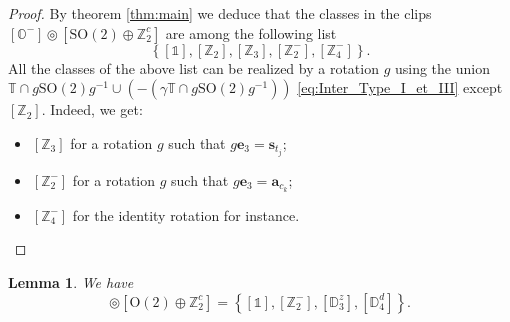 \documentclass[11pt,a4paper]{amsart}
\newtheorem{lem}[thm]{Lemma}
\theoremstyle{definition}
\newcommand{\ZZ}{\mathbb{Z}}                %
\newcommand{\OO}{\mathrm{O}}                %
\newcommand{\SO}{\mathrm{SO}}               %
\newcommand{\octa}{\mathbb{O}}              %
\newcommand{\tetra}{\mathbb{T}}             %
\newcommand{\DD}{\mathbb{D}}                %
\newcommand{\1}{\mathds{1}}		            %
\newcommand{\ee}{\pmb{e}}                   %
\newcommand{\uu}{\pmb{u}}                   %
\newcommand{\vR}{\mathbf{r}}
\newcommand{\bs}{\mathbf{s}}
\newcommand{\set}[1]{\left\{#1\right\}}     %
\begin{document}
\begin{proof}
	By theorem \ref{thm:main} we deduce that the classes in the clips $[\octa^-] \circledcirc [\SO(2) \oplus \ZZ_2^c]$ are among the following list
	\begin{equation*}
		\set{[\1],[\ZZ_2],[\ZZ_3],[\ZZ_2^-],[\ZZ_{4}^-]}.
	\end{equation*} 
	All the classes of the above list can be realized by a rotation $g$ using the union $ \tetra\cap g\SO(2)g^{-1} \cup (-(\gamma\tetra\cap g\SO(2)g^{-1}))$ \eqref{eq:Inter_Type_I_et_III} except $[\ZZ_2]$. Indeed, we get:
	\begin{itemize}
		\item $[\ZZ_3]$ for a rotation $g$ such that $g\ee_3=\pmb{s}_{t_j}$;
		\item $[\ZZ_2^-]$ for a rotation $g$ such that $g\ee_3=\pmb{a}_{c_k}$;
		\item $[\ZZ_{4}^-]$ for the identity rotation for instance.
	\end{itemize}

\end{proof}

\begin{lem}\label{lem:octaclipso(2)-}
	We have
	\begin{equation*}
		 [\octa^-] \circledcirc
		[\OO(2) \oplus \ZZ_2^c]=\set{[\1],[\ZZ_2^-],[\DD_3^z],[\DD_4^d]}.
	\end{equation*}
\end{lem}
\end{document}
